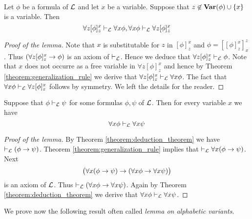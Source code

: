 \begin{lemma}\label{lemma:alpha_conversion}
Let $\phi$ be a formula of ${\mathcal L}$ and let $x$ be a variable. Suppose that $z \not \in \mathbf{Var}(\phi) \cup \{x\}$ is a variable. Then
$$\forall z[\phi]^x_z \vdash_{{\mathcal L}} \forall x\phi, \forall x\phi \vdash_{{\mathcal L}} \forall z[\phi]^x_z$$
\end{lemma}
\begin{proof}[Proof of the lemma]
Note that $x$ is substitutable for $z$ in $[\phi]^x_z$ and $\phi = [[\phi]^x_z]^z_x$. Thus $(\forall z[\phi]^x_z \rightarrow \phi)$ is an axiom of $\vdash_{{\mathcal L}}$. Hence we deduce that $\forall z[\phi]^x_z \vdash_{{\mathcal L}} \phi$. Note that $x$ does not occurre as a free variable in $\forall z[\phi]^x_z$ and hence by Theorem \ref{theorem:generalization_rule} we derive that $\forall z[\phi]^x_z  \vdash_{{\mathcal L}} \forall x\phi$. The fact that $\forall x \phi \vdash_{{\mathcal L}} \forall z[\phi]^x_z$ follows by symmetry. We left the details for the reader.
\end{proof}

\begin{lemma}\label{lemma:deduction_implies_quantified_deduction}
Suppose that $\phi \vdash_{{\mathcal L}} \psi$ for some formulas $\phi, \psi$ of ${\mathcal L}$. Then for every variable $x$ we have
$$\forall x\phi \vdash_{{\mathcal L}} \forall x\psi$$
\end{lemma}
\begin{proof}[Proof of the lemma]
By Theorem \ref{theorem:deduction_theorem} we have $\vdash_{{\mathcal L}} (\phi \rightarrow \psi)$. Theorem \ref{theorem:generalization_rule} implies that $\vdash_{{\mathcal L}} \forall x(\phi \rightarrow \psi)$. Next
$$\big(\forall x(\phi \rightarrow \psi) \rightarrow (\forall x\phi \rightarrow \forall x\psi)\big)$$
is an axiom of ${\mathcal L}$. Thus $\vdash_{{\mathcal L}} (\forall x\phi \rightarrow \forall x\psi)$. Again by Theorem \ref{theorem:deduction_theorem} we derive that $\forall x\phi \vdash_{{\mathcal L}} \forall x\psi$.
\end{proof}
\noindent
We prove now the following result often called \textit{lemma on alphabetic variants}.

